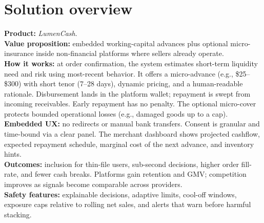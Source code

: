 \documentclass[11pt,a4paper]{article}
\begin{document}
\section*{Solution overview}
\textbf{Product:} \emph{LumenCash}.\\
\textbf{Value proposition:} embedded working-capital advances plus optional micro-insurance inside non-financial platforms where sellers already operate.\\
\textbf{How it works:} at order confirmation, the system estimates short-term liquidity need and risk using most-recent behavior. It offers a micro-advance (e.g., \$25--\$300) with short tenor (7--28 days), dynamic pricing, and a human-readable rationale. Disbursement lands in the platform wallet; repayment is swept from incoming receivables. Early repayment has no penalty. The optional micro-cover protects bounded operational losses (e.g., damaged goods up to a cap).\\
\textbf{Embedded UX:} no redirects or manual bank transfers. Consent is granular and time-bound via a clear panel. The merchant dashboard shows projected cashflow, expected repayment schedule, marginal cost of the next advance, and inventory hints.\\
\textbf{Outcomes:} inclusion for thin-file users, sub-second decisions, higher order fill-rate, and fewer cash breaks. Platforms gain retention and GMV; competition improves as signals become comparable across providers.\\
\textbf{Safety features:} explainable decisions, adaptive limits, cool-off windows, exposure caps relative to rolling net sales, and alerts that warn before harmful stacking.
\end{document}
